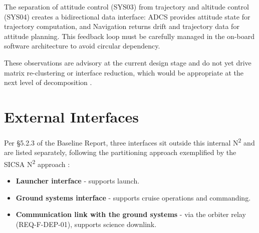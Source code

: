 The separation of attitude control (SYS03) from trajectory and altitude control (SYS04) creates a bidirectional data interface: ADCS provides attitude state for trajectory computation, and Navigation returns drift and trajectory data for attitude planning. This feedback loop must be carefully managed in the on-board software architecture to avoid circular dependency.

These observations are advisory at the current design stage and do not yet drive matrix re-clustering or interface reduction, which would be appropriate at the next level of decomposition \cite{becker2000}.

\section{External Interfaces}

Per §5.2.3 of the Baseline Report, three interfaces sit outside this internal N\textsuperscript{2} and are listed separately, following the partitioning approach exemplified by the SICSA N\textsuperscript{2} approach \cite{sicsa2016}:

\begin{itemize}
    \item \textbf{Launcher interface} - supports launch.
    \item \textbf{Ground systems interface} - supports cruise operations and commanding.
    \item \textbf{Communication link with the ground systems} - via the orbiter relay (REQ-F-DEP-01), supports science downlink.
\end{itemize}



